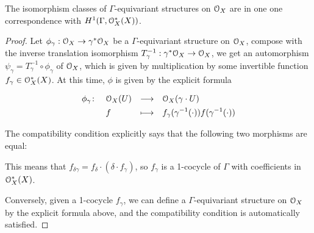 \documentclass[12pt]{amsart}
\numberwithin{equation}{section}
\newcommand{\defmap}[5]{
    \begin{equation*}
        \begin{aligned}
            #1 \colon \quad  & #2 &\longrightarrow &\quad #3 \\
            \quad  & #4    &\longmapsto  &\quad #5
        \end{aligned}
    \end{equation*}
}
\begin{document}
\begin{thm}
  The isomorphism classes of $\Gamma$-equivariant structures on ${\mathcal {O}}_X$ are in one one correspondence with $H^1(\Gamma, {\mathcal {O}}^{*}_X(X))$.
\end{thm}

\begin{proof}
  Let $\phi_{\gamma}: {\mathcal {O}}_X \to {\gamma}^* {\mathcal {O}}_X$ be a $\Gamma$-equivariant structure on ${\mathcal {O}}_X$, compose with the inverse translation isomorphism $T_{\gamma}^{-1}: {\gamma}^* {\mathcal {O}}_X \to {\mathcal {O}}_X$, we get an automorphism $\psi_{\gamma} = T_{\gamma}^{-1} \circ \phi_{\gamma}$ of ${\mathcal {O}}_X$, which is given by multiplication by some invertible function $f_{\gamma} \in {\mathcal {O}}^{*}_X(X)$. At this time, $\phi$ is given by the explicit formula
    \defmap{\phi_{\gamma}}{\CO_X(U)}{\CO_X(\gamma \cdot U)}{f}{f_{\gamma}(\gamma^{-1} (\cdot)) f(\gamma^{-1}(\cdot))}

  The compatibility condition explicitly says that the following two morphisms are equal:

\begin{center}
\end{center}

\begin{center}
\end{center}



This means that $f_{\delta \gamma} = f_{\delta} \cdot (\delta \cdot f_{\gamma})$, so $f_{\gamma}$ is a 1-cocycle of $\Gamma$ with coefficients in ${\mathcal {O}}^{*}_X(X)$.

  Conversely, given a 1-cocycle $f_{\gamma}$, we can define a $\Gamma$-equivariant structure on ${\mathcal {O}}_X$ by the explicit formula above, and the compatibility condition is automatically satisfied.


\end{proof}
\end{document}

